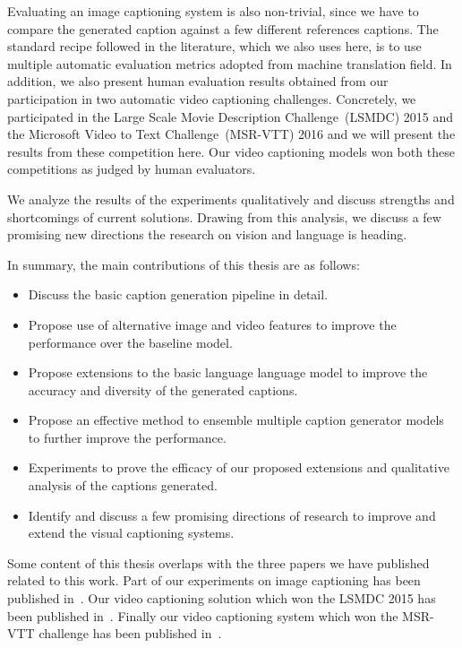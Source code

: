Evaluating an image captioning system is also non-trivial, since we have to
compare the generated caption against a few different references captions.
The standard recipe followed in the literature, which we also uses here,
is to use multiple automatic evaluation metrics adopted from machine translation
field. 
In addition, we also present human evaluation results obtained from our
participation in two automatic video captioning challenges.
Concretely, we participated in the  Large Scale Movie Description
Challenge~(LSMDC) 2015 and the Microsoft Video to Text Challenge~(MSR-VTT) 2016
and we will present the results from these competition here.
Our video captioning models won both these competitions as judged by human
evaluators.

We analyze the results of the experiments qualitatively and discuss strengths
and shortcomings of current solutions. 
Drawing from this analysis, we discuss a few promising new directions the
research on vision and language is heading.

In summary, the main contributions of this thesis are as follows:
\begin{itemize}
  \item Discuss the basic caption generation pipeline in detail. 
  \item Propose use of alternative image and video features to improve the
          performance over the baseline model.
  \item Propose extensions to the basic language language model to improve the
          accuracy and diversity of the generated captions.
  \item Propose an effective method to ensemble multiple caption generator
          models to further improve the performance.
  \item Experiments to prove the efficacy of our proposed extensions and qualitative
          analysis of the captions generated.
  \item Identify and discuss a few promising directions of research to improve
          and extend the visual captioning systems.
       
\end{itemize}

Some content of this thesis overlaps with the three papers we have published
related to this work.
Part of our experiments on image captioning has been published
in~\cite{ShettyACMMM2016Wrk}.
Our video captioning solution which won the LSMDC 2015 has been published
in~\cite{shetty2015video}.
Finally our video captioning system which won the MSR-VTT challenge has been
published in~\cite{ShettyACMMM2016}.
